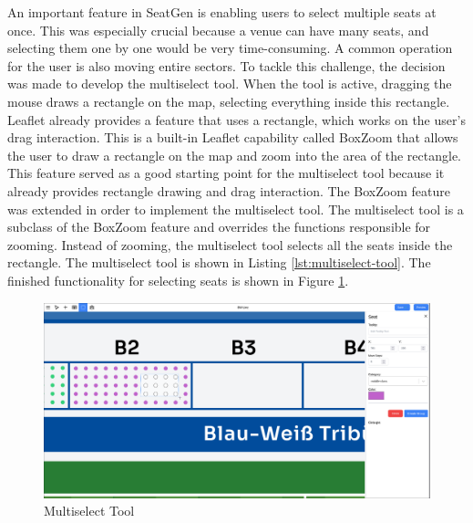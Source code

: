 An important feature in SeatGen is enabling users to select multiple seats at once. This was especially crucial because a venue can have many seats, and selecting them one by one would be very time-consuming. A common operation for the user is also moving entire sectors. To tackle this challenge, the decision was made to develop the multiselect tool. When the tool is active, dragging the mouse draws a rectangle on the map, selecting everything inside this rectangle. Leaflet already provides a feature that uses a rectangle, which works on the user's drag interaction. This is a built-in Leaflet capability called BoxZoom that allows the user to draw a rectangle on the map and zoom into the area of the rectangle. This feature served as a good starting point for the multiselect tool because it already provides rectangle drawing and drag interaction. The BoxZoom feature was extended in order to implement the multiselect tool. The multiselect tool is a subclass of the BoxZoom feature and overrides the functions responsible for zooming. Instead of zooming, the multiselect tool selects all the seats inside the rectangle. The multiselect tool is shown in Listing \ref{lst:multiselect-tool}. The finished functionality for selecting seats is shown in Figure \ref{fig:multiselect-tool}.
\begin{figure}
    \centering
    \includegraphics[scale=0.22]{pics/multiselect.png}
    \caption{Multiselect Tool}
    \label{fig:multiselect-tool}
\end{figure}

